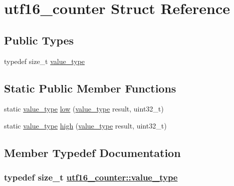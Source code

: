 \hypertarget{structutf16__counter}{
\section{utf16\_\-counter Struct Reference}
\label{structutf16__counter}
}
\subsection*{Public Types}
\begin{CompactItemize}
\item 
typedef size\_\-t \hyperlink{structutf16__counter_0d63f9ca809d182b2f184ef93bd11107}{value\_\-type}
\end{CompactItemize}
\subsection*{Static Public Member Functions}
\begin{CompactItemize}
\item 
static \hyperlink{structutf16__counter_0d63f9ca809d182b2f184ef93bd11107}{value\_\-type} \hyperlink{structutf16__counter_4571f3d0fbf0ce763904ec3321dcb41e}{low} (\hyperlink{structutf16__counter_0d63f9ca809d182b2f184ef93bd11107}{value\_\-type} result, uint32\_\-t)
\item 
static \hyperlink{structutf16__counter_0d63f9ca809d182b2f184ef93bd11107}{value\_\-type} \hyperlink{structutf16__counter_c1a8793996e57dc28fd22f3165628e4d}{high} (\hyperlink{structutf16__counter_0d63f9ca809d182b2f184ef93bd11107}{value\_\-type} result, uint32\_\-t)
\end{CompactItemize}


\subsection{Member Typedef Documentation}
\hypertarget{structutf16__counter_0d63f9ca809d182b2f184ef93bd11107}{
\subsubsection[value\_\-type]{\setlength{\rightskip}{0pt plus 5cm}typedef size\_\-t \hyperlink{structutf16__counter_0d63f9ca809d182b2f184ef93bd11107}{utf16\_\-counter::value\_\-type}}}
\label{structutf16__counter_0d63f9ca809d182b2f184ef93bd11107}





